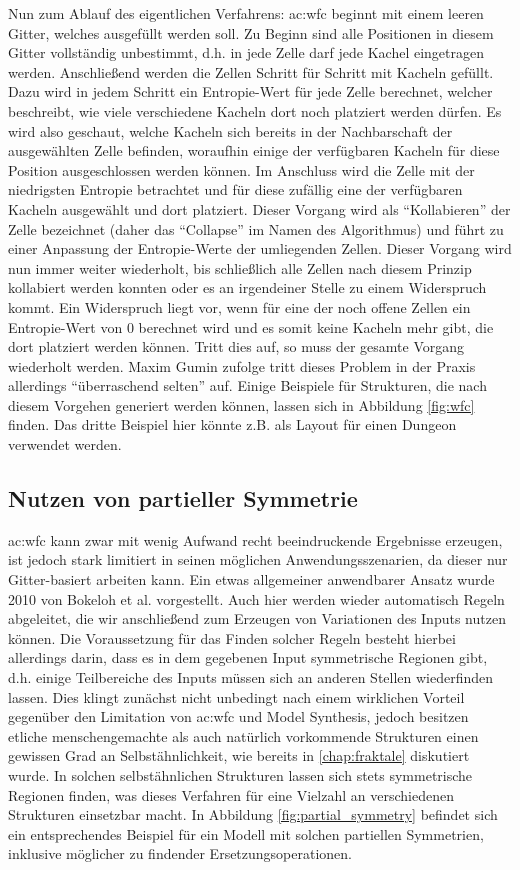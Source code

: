 Nun zum Ablauf des eigentlichen Verfahrens: \gls{ac:wfc} beginnt mit einem leeren Gitter, welches ausgefüllt werden soll. Zu Beginn sind alle Positionen
in diesem Gitter vollständig unbestimmt, d.h. in jede Zelle darf jede Kachel eingetragen werden. Anschließend werden die Zellen Schritt für Schritt mit
Kacheln gefüllt. Dazu wird in jedem Schritt ein Entropie-Wert für jede Zelle berechnet, welcher beschreibt, wie viele verschiedene Kacheln dort noch
platziert werden dürfen. Es wird also geschaut, welche Kacheln sich bereits in der Nachbarschaft der ausgewählten Zelle befinden, woraufhin einige der
verfügbaren Kacheln für diese Position ausgeschlossen werden können. Im Anschluss wird die Zelle mit der niedrigsten Entropie betrachtet und für diese
zufällig eine der verfügbaren Kacheln ausgewählt und dort platziert. Dieser Vorgang wird als ``Kollabieren'' der Zelle bezeichnet (daher das ``Collapse''
im Namen des Algorithmus) und führt zu einer Anpassung der Entropie-Werte der umliegenden Zellen. Dieser Vorgang wird nun immer weiter wiederholt, bis
schließlich alle Zellen nach diesem Prinzip kollabiert werden konnten oder es an irgendeiner Stelle zu einem Widerspruch kommt. Ein Widerspruch liegt
vor, wenn für eine der noch offene Zellen ein Entropie-Wert von \(0\) berechnet wird und es somit keine Kacheln mehr gibt, die dort platziert werden
können. Tritt dies auf, so muss der gesamte Vorgang wiederholt werden. Maxim Gumin zufolge tritt dieses Problem in der Praxis allerdings ``überraschend
selten'' auf. \cite{45_gumin} Einige Beispiele für Strukturen, die nach diesem Vorgehen generiert werden können, lassen sich in Abbildung \ref{fig:wfc}
finden. Das dritte Beispiel hier könnte z.B. als Layout für einen Dungeon verwendet werden.

\subsection{Nutzen von partieller Symmetrie}
\gls{ac:wfc} kann zwar mit wenig Aufwand recht beeindruckende Ergebnisse erzeugen, ist jedoch stark limitiert in seinen möglichen Anwendungsszenarien,
da dieser nur Gitter-basiert arbeiten kann. Ein etwas allgemeiner anwendbarer Ansatz wurde 2010 von Bokeloh et al. \cite{3_bokeloh_et_al} vorgestellt.
Auch hier werden wieder automatisch Regeln abgeleitet, die wir anschließend zum Erzeugen von Variationen des Inputs nutzen können. Die Voraussetzung
für das Finden solcher Regeln besteht hierbei allerdings darin, dass es in dem gegebenen Input symmetrische Regionen gibt, d.h. einige Teilbereiche des
Inputs müssen sich an anderen Stellen wiederfinden lassen. Dies klingt zunächst nicht unbedingt nach einem wirklichen Vorteil gegenüber den Limitation
von \gls{ac:wfc} und Model Synthesis, jedoch besitzen etliche menschengemachte als auch natürlich vorkommende Strukturen einen gewissen Grad an
Selbstähnlichkeit, wie bereits in \autoref{chap:fraktale} diskutiert wurde. In solchen selbstähnlichen Strukturen lassen sich stets symmetrische
Regionen finden, was dieses Verfahren für eine Vielzahl an verschiedenen Strukturen einsetzbar macht. \cite{3_bokeloh_et_al} In Abbildung \ref{fig:partial_symmetry}
befindet sich ein entsprechendes Beispiel für ein Modell mit solchen partiellen Symmetrien, inklusive möglicher zu findender Ersetzungsoperationen.

